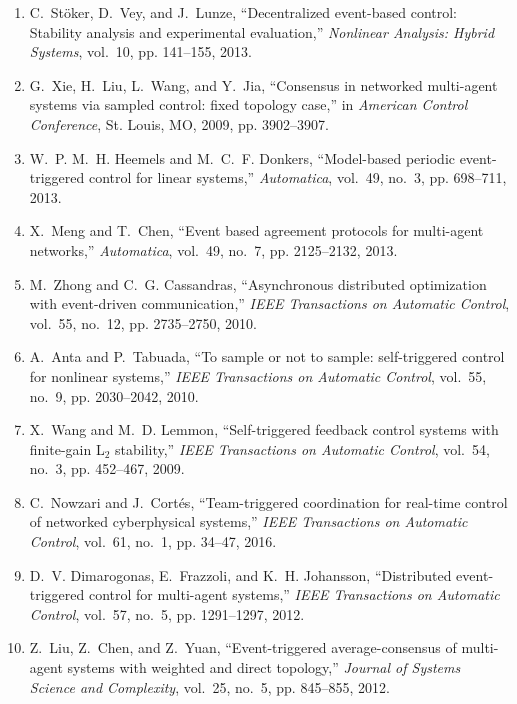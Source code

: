 \documentclass[]{book}
\begin{document}
\begin{enumerate}
\item
C.~St\"oker, D.~Vey, and J.~Lunze, ``Decentralized event-based control:
  Stability analysis and experimental evaluation,'' \emph{Nonlinear Analysis:
  Hybrid Systems}, vol.~10, pp. 141--155, 2013.

\item
G.~Xie, H.~Liu, L.~Wang, and Y.~Jia, ``Consensus in networked multi-agent
  systems via sampled control: fixed topology case,'' in \emph{{A}merican
  {C}ontrol {C}onference}, St. Louis, MO, 2009, pp. 3902--3907.

\item
W.~P. M.~H. Heemels and M.~C.~F. Donkers, ``Model-based periodic
  event-triggered control for linear systems,'' \emph{Automatica}, vol.~49,
  no.~3, pp. 698--711, 2013.

\item
X.~Meng and T.~Chen, ``Event based agreement protocols for multi-agent
  networks,'' \emph{Automatica}, vol.~49, no.~7, pp. 2125--2132, 2013.

\item
M.~Zhong and C.~G. Cassandras, ``Asynchronous distributed optimization with
  event-driven communication,'' \emph{IEEE Transactions on Automatic Control},
  vol.~55, no.~12, pp. 2735--2750, 2010.

\item
A.~Anta and P.~Tabuada, ``To sample or not to sample: self-triggered control
  for nonlinear systems,'' \emph{IEEE Transactions on Automatic Control},
  vol.~55, no.~9, pp. 2030--2042, 2010.

\item
X.~Wang and M.~D. Lemmon, ``Self-triggered feedback control systems with
  finite-gain {L}$_2$ stability,'' \emph{IEEE Transactions on Automatic
  Control}, vol.~54, no.~3, pp. 452--467, 2009.

\item
C.~Nowzari and J.~Cort{\'e}s, ``Team-triggered coordination for real-time
  control of networked cyberphysical systems,'' \emph{IEEE Transactions on
  Automatic Control}, vol.~61, no.~1, pp. 34--47, 2016.

\item
D.~V. Dimarogonas, E.~Frazzoli, and K.~H. Johansson, ``Distributed
  event-triggered control for multi-agent systems,'' \emph{IEEE Transactions on
  Automatic Control}, vol.~57, no.~5, pp. 1291--1297, 2012.

\item
Z.~Liu, Z.~Chen, and Z.~Yuan, ``Event-triggered average-consensus of
  multi-agent systems with weighted and direct topology,'' \emph{Journal of
  Systems Science and Complexity}, vol.~25, no.~5, pp. 845--855, 2012.


\end{enumerate}
\end{document}
